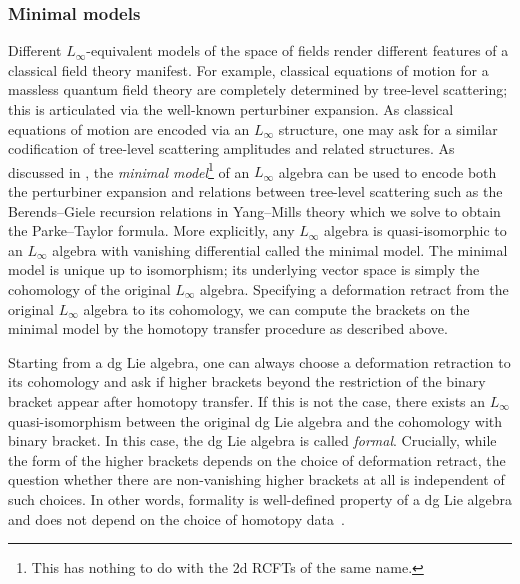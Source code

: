 \documentclass[pdftex]{sigma}
\numberwithin{equation}{section}
\theoremstyle{definition}
\begin{document}
\subsubsection{Minimal models}
Different $L_\infty$-equivalent models of the space of fields render different features of a classical field theory manifest. For example, classical equations of motion for a massless quantum field theory are completely determined by tree-level scattering; this is articulated via the well-known perturbiner expansion. As classical equations of motion are encoded via an $L_\infty$ structure, one may ask for a similar codification of tree-level scattering amplitudes and related structures. As discussed in \cite{perturbiner,Scattering-recursion}, the \textit{minimal model}\footnote{This has nothing to do with the 2d RCFTs of the same name.} of an $L_{\infty}$ algebra can be used to encode both the perturbiner expansion and relations between tree-level scattering such as the Berends--Giele recursion relations in Yang--Mills theory which we solve to obtain the Parke--Taylor formula. More explicitly, any $L_\infty$ algebra is quasi-isomorphic to an $L_\infty$ algebra with vanishing differential called the minimal model. The minimal model is unique up to isomorphism; its underlying vector space is simply the cohomology of the original $L_{\infty}$ algebra. Specifying a deformation retract from the original $L_\infty$ algebra to its cohomology, we can compute the brackets on the minimal model by the homotopy transfer procedure as described above.

Starting from a dg Lie algebra, one can always choose a deformation retraction to its cohomology and ask if higher brackets beyond the restriction of the binary bracket appear after homotopy transfer. If this is not the case, there exists an $L_\infty$ quasi-isomorphism between the original dg Lie algebra and the cohomology with binary bracket. In this case, the dg Lie algebra is called \emph{formal}. Crucially, while the form of the higher brackets depends on the choice of deformation retract, the question whether there are non-vanishing higher brackets at all is independent of such choices. In other words, formality is well-defined property of a dg Lie algebra and does not depend on the choice of homotopy data~\cite{LodayVallette}.
\end{document}
